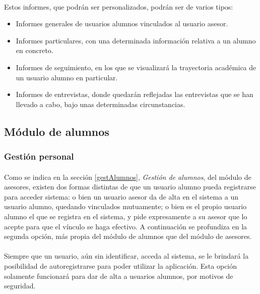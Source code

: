       \paragraph{}Estos informes, que podrán ser personalizados, podrán ser
      de varios tipos:

      \begin{itemize}
       \item Informes generales de usuarios alumnos vinculados al usuario
             asesor.
       \item Informes particulares, con una determinada información relativa a
             un alumno en concreto.
       \item Informes de seguimiento, en los que se visualizará la trayectoria
             académica de un usuario alumno en particular.
       \item Informes de entrevistas, donde quedarán reflejadas las entrevistas
             que se han llevado a cabo, bajo unas determinadas circunstancias.
      \end{itemize}


   \subsection{Módulo de alumnos}\label{modAlumnos}

      \subsubsection{Gestión personal}

      \paragraph{}Como se indica en la sección \ref{gestAlumnos},
      \textit{Gestión de alumnos}, del módulo de asesores, existen dos formas
      distintas de que un usuario alumno pueda registrarse para acceder sistema:
      o bien un usuario asesor da de alta en el sistema a un usuario alumno,
      quedando vinculados mutuamente; o bien es el propio usuario alumno el que
      se registra en el sistema, y pide expresamente a su asesor que lo acepte
      para que el vínculo se haga efectivo. A continuación se profundiza en
      la segunda opción, más propia del módulo de alumnos que del módulo de
      asesores.

      \paragraph{}Siempre que un usuario, aún sin identificar, acceda al
      sistema, se le brindará la posibilidad de autoregistrarse para poder
      utilizar la aplicación. Esta opción solamente funcionará para dar de alta
      a usuarios alumnos, por motivos de seguridad.

